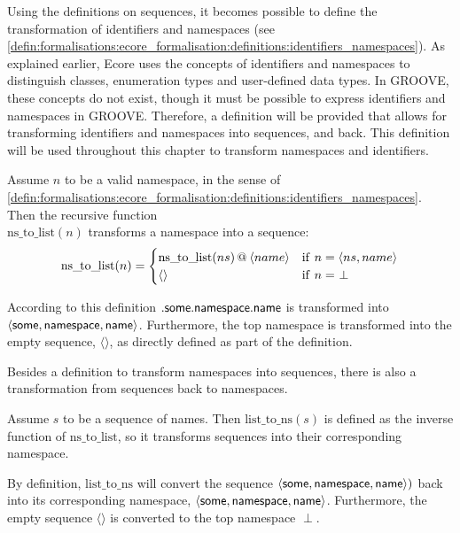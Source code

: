 Using the definitions on sequences, it becomes possible to define the transformation of identifiers and namespaces (see \cref{defin:formalisations:ecore_formalisation:definitions:identifiers_namespaces}). As explained earlier, Ecore uses the concepts of identifiers and namespaces to distinguish classes, enumeration types and user-defined data types. In GROOVE, these concepts do not exist, though it must be possible to express identifiers and namespaces in GROOVE. Therefore, a definition will be provided that allows for transforming identifiers and namespaces into sequences, and back. This definition will be used throughout this chapter to transform namespaces and identifiers.

\begin{defin}
\label{defin:library_of_transformations:definitions:ns_to_list}
Assume $n$ to be a valid namespace, in the sense of \cref{defin:formalisations:ecore_formalisation:definitions:identifiers_namespaces}. Then the recursive function \\$\mathrm{ns\_\!to\_\!list}(n)$ transforms a namespace into a sequence:
\begin{equation*}
    \mathrm{ns\_\!to\_\!list}(n) = \begin{cases}
        \mathrm{ns\_\!to\_\!list}(ns) \operatorname{@\:} \langle name \rangle & \mathrm{if }\ n = \langle ns, name \rangle \\
        \langle \rangle & \mathrm{if }\ n =\ \perp
    \end{cases}
\end{equation*}
\end{defin}

According to this definition $.\mathsf{some}.\mathsf{namespace}.\mathsf{name}$ is transformed into $\langle \mathsf{some}, \mathsf{namespace}, \mathsf{name} \rangle$. Furthermore, the top namespace is transformed into the empty sequence, $\langle \rangle$, as directly defined as part of the definition.

Besides a definition to transform namespaces into sequences, there is also a transformation from sequences back to namespaces.

\begin{defin}
\label{defin:library_of_transformations:definitions:list_to_ns}
Assume $s$ to be a sequence of names. Then $\mathrm{list\_\!to\_\!ns}(s)$ is defined as the inverse function of $\mathrm{ns\_\!to\_\!list}$, so it transforms sequences into their corresponding namespace.
\end{defin}

By definition, $\mathrm{list\_\!to\_\!ns}$ will convert the sequence $\langle \mathsf{some}, \mathsf{namespace}, \mathsf{name} \rangle)$ back into its corresponding namespace, $\langle \mathsf{some}, \mathsf{namespace}, \mathsf{name} \rangle$. Furthermore, the empty sequence $\langle \rangle$ is converted to the top namespace $\perp$.